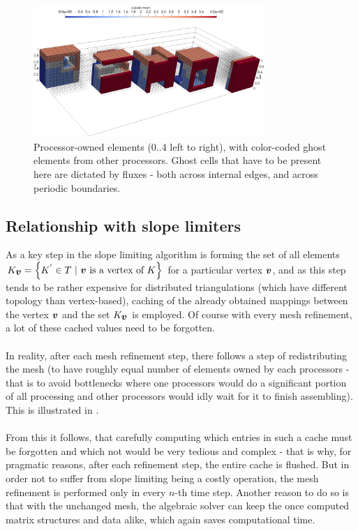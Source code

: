 \begin{figure}[H]
		\begin{center}
			\includegraphics[width=0.78\textwidth]{img/mesh/cube-periodic,ghost.jpg}
			\vspace{-2mm}
		\caption{Processor-owned elements (0..4 left to right), with color-coded ghost elements from other processors. Ghost cells that have to be present here are dictated by fluxes - both across internal edges, and across periodic boundaries.}
		\label{figure:ghostPer}
		\end{center}
	\end{figure}\vspace{-5mm}

\subsection{Relationship with slope limiters}
As a key step in the slope limiting algorithm  is forming the set of all elements $K_{\bfv} = \left\{K^{'}\in T\ |\ \bfv \text{ is a vertex of } K\right\}$ for a particular vertex $\mbox{\boldmath $v$}$, and as this step tends to be rather expensive for distributed triangulations (which have different topology than vertex-based), caching of the already obtained mappings between the vertex $\mbox{\boldmath $v$}$ and the set $K_{\mbox{\boldmath $v$}}$ is employed. Of course with every mesh refinement, a lot of these cached values need to be forgotten.
\paragraph{}
In reality, after each mesh refinement step, there follows a step of redistributing the mesh (to have roughly equal number of elements owned by each processors - that is to avoid bottlenecks where one processors would do a significant portion of all processing and other processors would idly wait for it to finish assembling). This is illustrated in .
\paragraph{}
From this it follows, that carefully computing which entries in such a cache must be forgotten and which not would be very tedious and complex - that is why, for pragmatic reasons, after each refinement step, the entire cache is flushed. But in order not to suffer from slope limiting being a costly operation, the mesh refinement is performed only in every $n$-th time step. Another reason to do so is that with the unchanged mesh, the algebraic solver can keep the once computed matrix structures and data alike, which again saves computational time.
